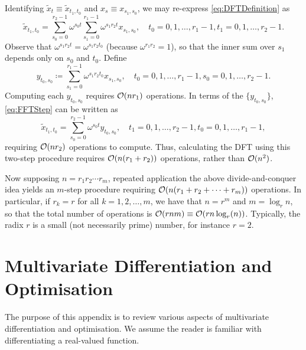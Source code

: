 Identifying \(\widetilde{x}_t \equiv \widetilde{x}_{t_1, t_0}\) and \(x_s \equiv x_{s_1, s_0}\), we may re-express \eqref{eq:DFTDefinition} as
\begin{equation}
	\widetilde{x}_{t_1, t_0} = \sum_{s_0=0}^{r_2-1} \omega^{s_0 t} \sum_{s_1=0}^{r_1-1} \omega^{s_1 r_2 t} x_{s_1, s_0}, \quad t_0 = 0, 1, \dots, r_1 - 1, t_1 = 0, 1, \dots, r_2 - 1. \label{eq:FFTStep}
\end{equation}
Observe that \(\omega^{s_1 r_2 t} = \omega^{s_1 r_2 t_0}\) (because \(\omega^{r_1 r_2} = 1\)), so that the inner sum over \(s_1\) depends only on \(s_0\) and \(t_0\). Define
\begin{equation*}
	y_{t_0, s_0} \coloneqq \sum_{s_1=0}^{r_1-1} \omega^{s_1 r_2 t_0} x_{s_1, s_0}, \quad t_0 = 0, 1, \dots, r_1 - 1, s_0 = 0, 1, \dots, r_2 - 1.
\end{equation*}
Computing each \(y_{t_0, s_0}\) requires \(\mathcal{O}(n r_1)\) operations. In terms of the \(\{y_{t_0, s_0}\}\), \eqref{eq:FFTStep} can be written as
\begin{equation*}
	\widetilde{x}_{t_1, t_0} = \sum_{s_0=0}^{r_2-1} \omega^{s_0 t} y_{t_0, s_0}, \quad t_1 = 0, 1, \dots, r_2 - 1, t_0 = 0, 1, \dots, r_1 - 1,
\end{equation*}
requiring \(\mathcal{O}(n r_2)\) operations to compute. Thus, calculating the DFT using this two-step procedure requires \(\mathcal{O}(n(r_1 + r_2))\) operations, rather than \(\mathcal{O}(n^2)\).

Now supposing \(n = r_1 r_2 \cdots r_m\), repeated application the above divide-and-conquer idea yields an \(m\)-step procedure requiring \(\mathcal{O}(n(r_1 + r_2 + \dots + r_m))\) operations. In particular, if \(r_k = r\) for all \(k=1, 2, \dots, m\), we have that \(n = r^m\) and \(m = \log_r n\), so that the total number of operations is \(\mathcal{O}(r n m) \equiv \mathcal{O}(r n \log_r(n))\). Typically, the radix \(r\) is a small (not necessarily prime) number, for instance \(r=2\).

\section{Multivariate Differentiation and Optimisation}
The purpose of this appendix is to review various aspects of multivariate differentiation and optimisation. We assume the reader is familiar with differentiating a real-valued function.
